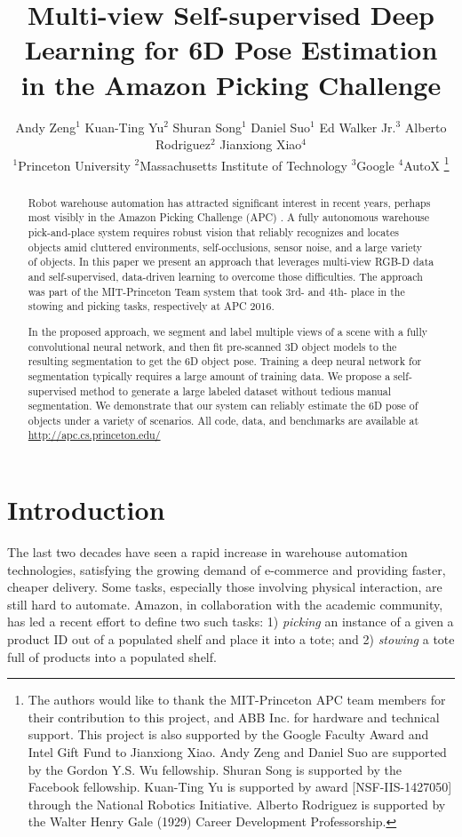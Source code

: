 \documentclass[letterpaper, 10 pt, conference]{ieeeconf}  %
\title{\LARGE \bf
Multi-view Self-supervised Deep Learning for 6D Pose Estimation \\in the Amazon Picking Challenge}
\author{Andy Zeng$^{1}$  Kuan-Ting Yu$^{2}$  Shuran Song$^{1}$  Daniel Suo$^{1}$  Ed Walker Jr.$^{3}$ Alberto Rodriguez$^{2}$  Jianxiong Xiao$^{4}$
\vspace{0.1cm} \\ 
$^{1}$Princeton University\quad\quad
$^{2}$Massachusetts Institute of Technology\quad\quad
$^{3}$Google\quad\quad
$^{4}$AutoX
\thanks{The authors would like to thank the MIT-Princeton APC team members for their contribution to this project, and ABB Inc. for hardware and technical support. This project is also supported by the Google Faculty Award and Intel Gift Fund to Jianxiong Xiao. Andy Zeng and Daniel Suo are supported by the Gordon Y.S. Wu fellowship. Shuran Song is supported by the Facebook fellowship. Kuan-Ting Yu is supported by award [NSF-IIS-1427050] through the National Robotics Initiative. Alberto Rodriguez is supported by the Walter Henry Gale (1929) Career Development Professorship.}
}
\begin{document}
\maketitle
\thispagestyle{empty}
\pagestyle{empty}


\begin{abstract}

Robot warehouse automation has attracted significant interest in recent years, perhaps most visibly in the Amazon Picking Challenge (APC) \cite{apcwebsite}. 
A fully autonomous warehouse pick-and-place system requires robust vision that reliably recognizes and locates objects amid cluttered environments, self-occlusions, sensor noise, and a large variety of objects.
In this paper we present an approach that leverages multi-view RGB-D data and self-supervised, data-driven learning to overcome those difficulties.
The approach was part of the MIT-Princeton Team system that took 3rd- and 4th- place in the stowing and picking tasks, respectively at APC 2016.


In the proposed approach, we segment and label multiple views of a scene with a fully convolutional neural network, and then fit pre-scanned 3D object models to the resulting segmentation to get the 6D object pose.
Training a deep neural network for segmentation typically requires a large amount of training data.
We propose a self-supervised method to generate a large labeled dataset without tedious manual segmentation.
We demonstrate that our system can reliably estimate the 6D pose of objects under a variety of scenarios. All code, data, and benchmarks are available at \href{http://apc.cs.princeton.edu/}{http://apc.cs.princeton.edu/}

\end{abstract}



\section{Introduction}
The last two decades have seen a rapid increase in warehouse automation technologies, satisfying the growing demand of e-commerce and providing faster, cheaper delivery. Some tasks, especially those involving physical interaction, are still hard to automate. Amazon, in collaboration with the academic community, has led a recent effort to define two such tasks: 
1) \emph{picking} an instance of a given a product ID out of a populated shelf and place it into a tote; 
and 2) \emph{stowing} a tote full of products into a populated shelf.
\end{document}
